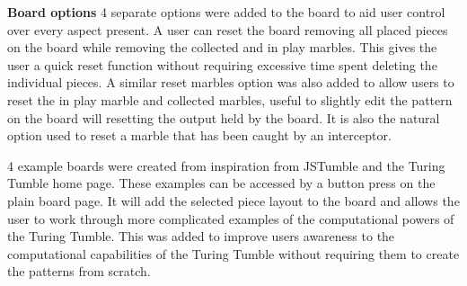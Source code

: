 \documentclass{l4proj}
\begin{document}
\textbf{Board options}
4 separate options were added to the board to aid user control over every aspect present. A user can reset the board removing all placed pieces on the board while removing the collected and in play marbles. This gives the user a quick reset function without requiring excessive time spent deleting the individual pieces. A similar reset marbles option was also added to allow users to reset the in play marble and collected marbles, useful to slightly edit the pattern on the board will resetting the output held by the board. It is also the natural option used to reset a marble that has been caught by an interceptor.

4 example boards were created from inspiration from JSTumble and the Turing Tumble home page. These examples can be accessed by a button press on the plain board page. It will add the selected piece layout to the board and allows the user to work through more complicated examples of the computational powers of the Turing Tumble. This was added to improve users awareness to the computational capabilities of the Turing Tumble without requiring them to create the patterns from scratch. 
\end{document}
